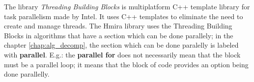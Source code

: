The library \emph{Threading Building Blocks}\cite{Reinders2010}\cite{Pheatt2008}
is multiplatform C++ template library
for task parallelism made by Intel\textregistered. It uses C++ templates to eliminate the need to
create and manage threads. The Hmira library uses the Threading Building Blocks in algorithms
that have a section which can be done parallely; in the chapter \ref{chap:alg_decomp}, the
section which can be done paralelly is labeled with \textbf{parallel}. E.g.: the \textbf{parallel for}
does not necessarily mean that the block must be a parallel loop; it means that the block of code
provides an option being done parallelly.
